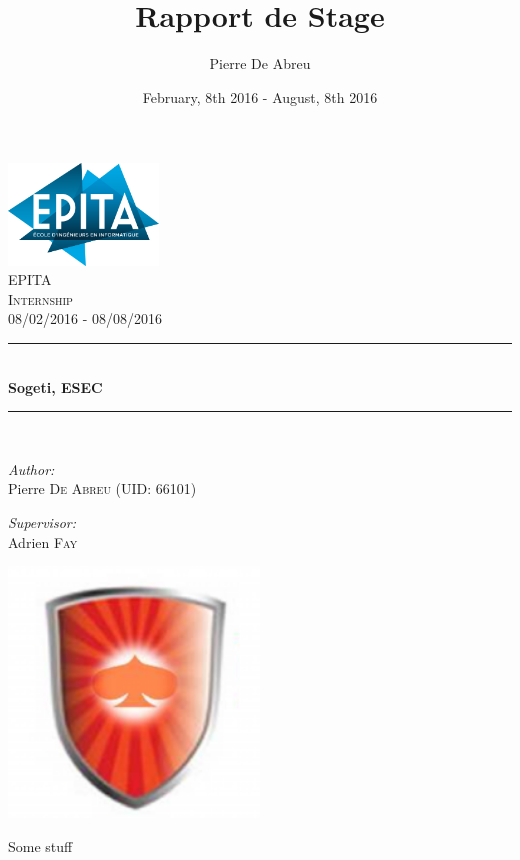\documentclass[a4paper, 12pt]{report}
\title{Rapport de Stage}
\author{Pierre De Abreu}
\date{February, 8th 2016 - August, 8th 2016}
\newcommand{\HRule}{\rule{\linewidth}{0.5mm}}
\begin{document}
\begin{titlepage}
\begin{center}

\includegraphics[width=0.3\textwidth]{images/epita.png}~\\[1cm]

\textsc{\LARGE EPITA}\\[1.5cm]

\textsc{\Large  Internship}\\[0.5cm]
\textsc{\Large 08/02/2016 - 08/08/2016}

\HRule \\[0.4cm]
{ \huge \bfseries Sogeti, ESEC \\[0.4cm] }

\HRule \\[1.5cm]

\begin{minipage}{0.4\textwidth}
\begin{flushleft} \large
\emph{Author:}\\
Pierre \textsc{De Abreu (UID: 66101)}
\end{flushleft}
\end{minipage}
\begin{minipage}{0.4\textwidth}
\begin{flushright} \large
\emph{Supervisor:} \\
Adrien \textsc{Fay}
\end{flushright}
\end{minipage}

\includegraphics[width=0.5\textwidth]{images/esec.png}~\\[1cm]

\vfill

{\large Some stuff}
\end{center}
\end{titlepage}
\end{document}
